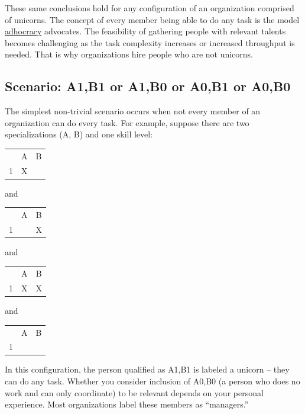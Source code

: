 These same conclusions hold for any configuration of an organization comprised of unicorns. 
The concept of every member being able to do any task is the model 
\href{https://en.wikipedia.org/wiki/Adhocracy}{adhocracy} advocates. The feasibility of gathering people with relevant talents becomes challenging as the task complexity increases or increased throughput is needed. That is why organizations hire people who are not unicorns. 



\subsection*{Scenario: A1,B1 or A1,B0 or A0,B1 or A0,B0}

The simplest non-trivial scenario occurs when not every member of an organization can do every task. For example, suppose  there are two specializations (A, B) and one skill level: 

\begin{center}
\begin{tabular}{c|c|c|}
  & A & B \\
\cline{2-3}
1 & X &   \\
\cline{2-3}
\end{tabular}
\quad and \quad
\begin{tabular}{c|c|c|}
  & A & B \\
\cline{2-3}
1 &   & X \\
\cline{2-3}
\end{tabular}
\quad and \quad
\begin{tabular}{c|c|c|}
  & A & B \\
\cline{2-3}
1 & X & X \\
\cline{2-3}
\end{tabular}
\quad and \quad
\begin{tabular}{c|c|c|}
  & A & B \\
\cline{2-3}
1 &   &   \\
\cline{2-3}
\end{tabular}
\end{center}
In this configuration, the person qualified as A1,B1 is labeled a unicorn -- they can do any task. Whether you consider inclusion of A0,B0 (a person who does no work and can only coordinate) to be relevant depends on your personal experience. Most organizations label these members as ``managers.'' 

